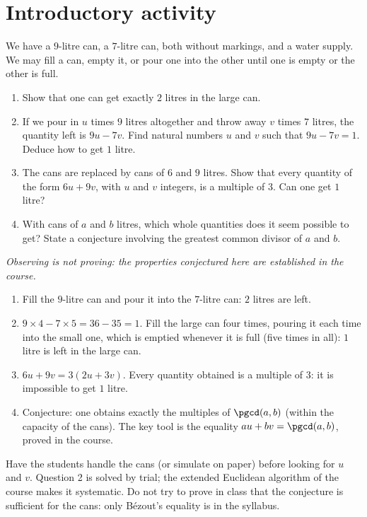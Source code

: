 \section{Introductory activity}
\begin{activity}
We have a $9$-litre can, a $7$-litre can, both without markings, and a water supply. We may fill a can, empty it, or pour one into the other until one is empty or the other is full.
\begin{enumerate}
\item Show that one can get exactly $2$ litres in the large can.
\item If we pour in $u$ times $9$ litres altogether and throw away $v$ times $7$ litres, the quantity left is $9u-7v$. Find natural numbers $u$ and $v$ such that $9u-7v=1$. Deduce how to get $1$ litre.
\item The cans are replaced by cans of $6$ and $9$ litres. Show that every quantity of the form $6u+9v$, with $u$ and $v$ integers, is a multiple of $3$. Can one get $1$ litre?
\item With cans of $a$ and $b$ litres, which whole quantities does it seem possible to get? State a conjecture involving the greatest common divisor of $a$ and $b$.
\end{enumerate}
\par\emph{Observing is not proving: the properties conjectured here are established in the course.}
\end{activity}
\begin{solution}[Activity]
\begin{enumerate}
\item Fill the $9$-litre can and pour it into the $7$-litre can: $2$ litres are left.
\item $9\times4-7\times5=36-35=1$. Fill the large can four times, pouring it each time into the small one, which is emptied whenever it is full (five times in all): $1$ litre is left in the large can.
\item $6u+9v=3(2u+3v)$. Every quantity obtained is a multiple of $3$: it is impossible to get $1$ litre.
\item Conjecture: one obtains exactly the multiples of $\pgcd(a,b)$ (within the capacity of the cans). The key tool is the equality $au+bv=\pgcd(a,b)$, proved in the course.
\end{enumerate}
\end{solution}
\begin{teachernote}
Have the students handle the cans (or simulate on paper) before looking for $u$ and $v$. Question 2 is solved by trial; the extended Euclidean algorithm of the course makes it systematic. Do not try to prove in class that the conjecture is sufficient for the cans: only Bézout's equality is in the syllabus.
\end{teachernote}

